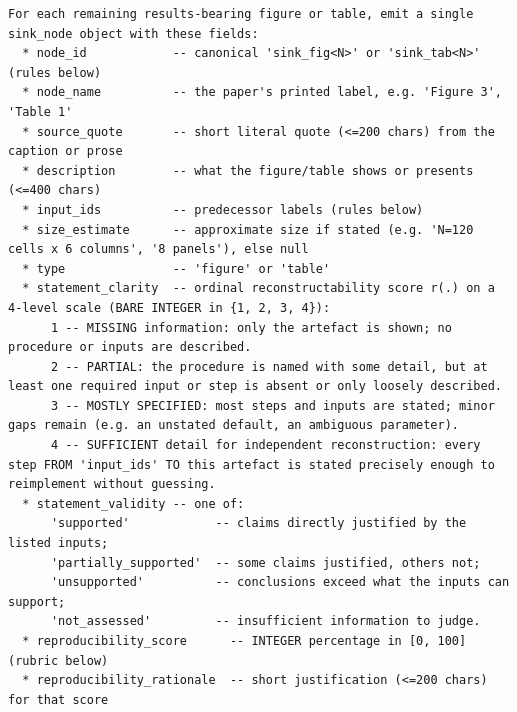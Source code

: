 \documentclass{article}
\begin{document}
\begin{lstlisting}
For each remaining results-bearing figure or table, emit a single sink_node object with these fields:
  * node_id            -- canonical 'sink_fig<N>' or 'sink_tab<N>' (rules below)
  * node_name          -- the paper's printed label, e.g. 'Figure 3', 'Table 1'
  * source_quote       -- short literal quote (<=200 chars) from the caption or prose
  * description        -- what the figure/table shows or presents (<=400 chars)
  * input_ids          -- predecessor labels (rules below)
  * size_estimate      -- approximate size if stated (e.g. 'N=120 cells x 6 columns', '8 panels'), else null
  * type               -- 'figure' or 'table'
  * statement_clarity  -- ordinal reconstructability score r(.) on a 4-level scale (BARE INTEGER in {1, 2, 3, 4}):
      1 -- MISSING information: only the artefact is shown; no procedure or inputs are described.
      2 -- PARTIAL: the procedure is named with some detail, but at least one required input or step is absent or only loosely described.
      3 -- MOSTLY SPECIFIED: most steps and inputs are stated; minor gaps remain (e.g. an unstated default, an ambiguous parameter).
      4 -- SUFFICIENT detail for independent reconstruction: every step FROM 'input_ids' TO this artefact is stated precisely enough to reimplement without guessing.
  * statement_validity -- one of:
      'supported'            -- claims directly justified by the listed inputs;
      'partially_supported'  -- some claims justified, others not;
      'unsupported'          -- conclusions exceed what the inputs can support;
      'not_assessed'         -- insufficient information to judge.
  * reproducibility_score      -- INTEGER percentage in [0, 100] (rubric below)
  * reproducibility_rationale  -- short justification (<=200 chars) for that score


\end{lstlisting}
\end{document}
